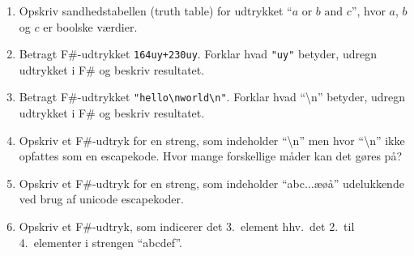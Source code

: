 \documentclass[a4paper,12pt]{article}
\begin{document}
\begin{enumerate}[label=2ø.\arabic*,start=0]
\item Opskriv sandhedstabellen (truth table) for udtrykket "`$a \text{ or } b \text{ and } c$"', hvor $a$, $b$ og $c$ er boolske værdier.
\item Betragt F\#-udtrykket \lstinline{164uy+230uy}. Forklar hvad \lstinline{"uy"} betyder, udregn udtrykket i F\# og beskriv resultatet.
\item Betragt F\#-udtrykket \lstinline{"hello\nworld\n"}. Forklar hvad "`\textbackslash n"' betyder, udregn udtrykket i F\# og beskriv resultatet.
\item Opskriv et F\#-udtryk for en streng, som indeholder "`\textbackslash n"' men hvor "`\textbackslash n"' ikke opfattes som en escapekode. Hvor mange forskellige måder kan det gøres på?
\item Opskriv et F\#-udtryk for en streng, som indeholder "`abc...æøå"' udelukkende ved brug af unicode escapekoder.
\item Opskriv et F\#-udtryk, som indicerer det 3.\ element hhv.\ det 2.\ til 4.\ elementer i strengen "`abcdef"'.
\end{enumerate}
\end{document}
